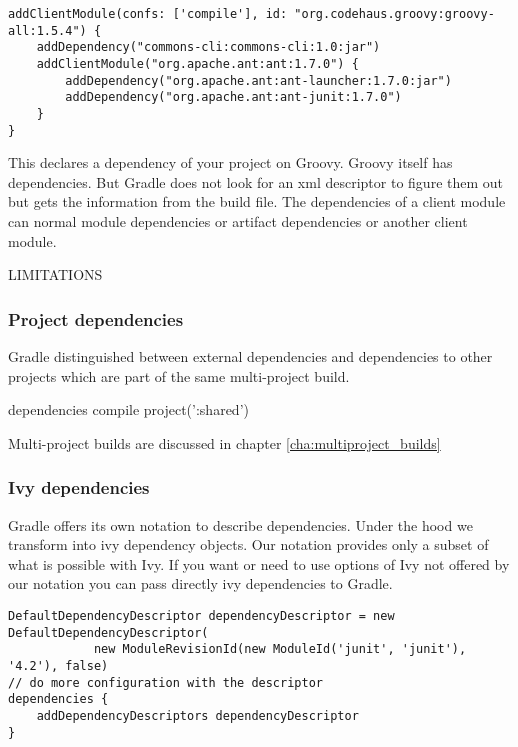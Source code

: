 \begin{Verbatim}
addClientModule(confs: ['compile'], id: "org.codehaus.groovy:groovy-all:1.5.4") {
    addDependency("commons-cli:commons-cli:1.0:jar")
    addClientModule("org.apache.ant:ant:1.7.0") {
        addDependency("org.apache.ant:ant-launcher:1.7.0:jar")
        addDependency("org.apache.ant:ant-junit:1.7.0")
    }
}
\end{Verbatim}

This declares a dependency of your project on Groovy. Groovy itself has dependencies. But Gradle does not look for an xml descriptor to figure them out but gets the information from the build file. The dependencies of a client module can normal module dependencies or artifact dependencies or another client module. 

LIMITATIONS

\subsubsection{Project dependencies} %
\label{ssub:project_dependencies}

Gradle distinguished between external dependencies and dependencies to other projects which are part of the same multi-project build. 

dependencies {
    compile project(':shared')
}

Multi-project builds are discussed in chapter \ref{cha:multiproject_builds}

\subsubsection{Ivy dependencies} %
\label{ssub:ivy_dependencies}

Gradle offers its own notation to describe dependencies. Under the hood we transform into ivy dependency objects. Our notation provides only a subset of what is possible with Ivy. If you want or need to use options of Ivy not offered by our notation you can pass directly ivy dependencies to Gradle.

\begin{Verbatim}
DefaultDependencyDescriptor dependencyDescriptor = new DefaultDependencyDescriptor(
	        new ModuleRevisionId(new ModuleId('junit', 'junit'), '4.2'), false)
// do more configuration with the descriptor
dependencies {
	addDependencyDescriptors dependencyDescriptor 
}
\end{Verbatim}

